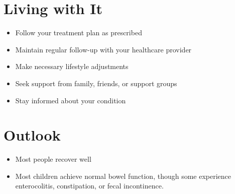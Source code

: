 \section{Living with It}
\begin{itemize}[noitemsep]
  \item Follow your treatment plan as prescribed
  \item Maintain regular follow-up with your healthcare provider
  \item Make necessary lifestyle adjustments
  \item Seek support from family, friends, or support groups
  \item Stay informed about your condition
\end{itemize}
\section{Outlook}
\begin{itemize}[noitemsep]
  \item Most people recover well
  \item Most children achieve normal bowel function, though some experience enterocolitis, constipation, or fecal incontinence.
\end{itemize}
